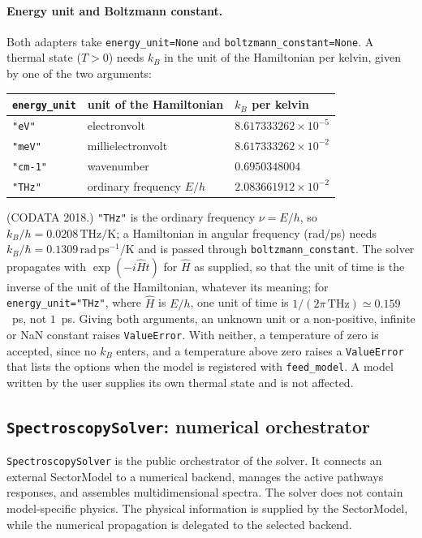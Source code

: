 \documentclass[11pt]{article}
\begin{document}
\paragraph{Energy unit and Boltzmann constant.}
\label{sec:energy-units}
Both adapters take \texttt{energy\_unit=None} and \texttt{boltzmann\_constant=None}. A thermal state ($T>0$) needs $k_B$ in the unit of the Hamiltonian per kelvin, given by one of the two arguments:
\begin{center}
\begin{tabular}{lll}
\toprule
\texttt{energy\_unit} & unit of the Hamiltonian & $k_B$ per kelvin\\
\midrule
\texttt{"eV"} & electronvolt & $8.617333262\times10^{-5}$\\
\texttt{"meV"} & millielectronvolt & $8.617333262\times10^{-2}$\\
\texttt{"cm-1"} & wavenumber & $0.6950348004$\\
\texttt{"THz"} & ordinary frequency $E/h$ & $2.083661912\times10^{-2}$\\
\bottomrule
\end{tabular}
\end{center}
(CODATA 2018.) \texttt{"THz"} is the ordinary frequency $\nu=E/h$, so $k_B/h=0.0208\,\mathrm{THz/K}$; a Hamiltonian in angular frequency (rad/ps) needs $k_B/\hbar=0.1309\,\mathrm{rad\,ps^{-1}/K}$ and is passed through \texttt{boltzmann\_constant}. The solver propagates with $\exp(-i\hat Ht)$ for $\hat H$ as supplied, so that the unit of time is the inverse of the unit of the Hamiltonian, whatever its meaning; for \texttt{energy\_unit="THz"}, where $\hat H$ is $E/h$, one unit of time is $1/(2\pi\,\mathrm{THz})\simeq0.159$~ps, not $1$~ps. Giving both arguments, an unknown unit or a non-positive, infinite or NaN constant raises \texttt{ValueError}. With neither, a temperature of zero is accepted, since no $k_B$ enters, and a temperature above zero raises a \texttt{ValueError} that lists the options when the model is registered with \texttt{feed\_model}. A model written by the user supplies its own thermal state and is not affected.








\subsection{\texttt{SpectroscopySolver}: numerical orchestrator}

\texttt{SpectroscopySolver} is the public orchestrator of the solver. It connects an external SectorModel to a numerical backend, manages the active pathways responses, and assembles multidimensional spectra. The solver does not contain model-specific physics. The physical information is supplied by the SectorModel, while the numerical propagation is delegated to the selected backend.
\end{document}
